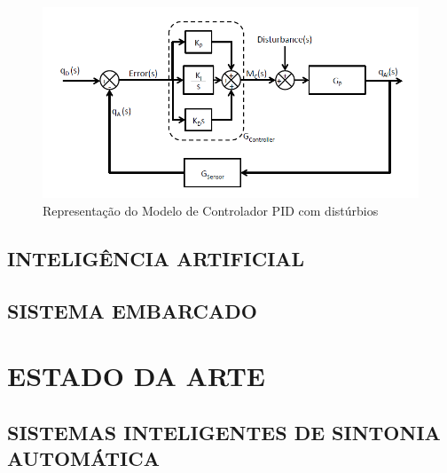 \begin{figure}[htb]
	\caption{Representação do Modelo de Controlador PID com distúrbios}
	\begin{center}
	    \includegraphics[scale=0.75]{img/pid_disturbe}
	\end{center}
\end{figure}


\subsection{INTELIGÊNCIA ARTIFICIAL}

\subsection{SISTEMA EMBARCADO}

\section{ESTADO DA ARTE}

\subsection{SISTEMAS INTELIGENTES DE SINTONIA AUTOMÁTICA}